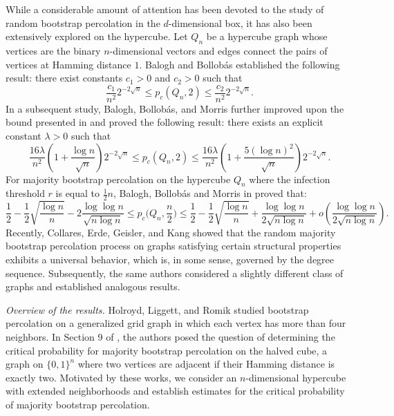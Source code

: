 \documentclass[reqno,11pt]{amsart}
\renewcommand{\leq}{\leqslant}
\begin{document}
   While a considerable amount of attention has been devoted to the study of random bootstrap percolation in the $d$-dimensional box, it has also been extensively explored on the hypercube. Let $Q_n$ be a hypercube graph whose vertices are the binary $n$-dimensional vectors and edges connect the pairs of vertices at Hamming distance $1$. Balogh and Bollob{\'a}s \cite{balogh_bollobas_2006} established the following result: there exist constants $c_1>0$ and $c_2>0$ such that
       $$ \frac{c_1}{n^2}2^{-2\sqrt{n}}\leq p_c(Q_n,2) \leq \frac{c_2}{n^2}2^{-2\sqrt{n}}.$$
    In a subsequent study, Balogh, Bollob{\'a}s, and Morris further improved upon the bound presented in \cite{balogh_bollobas_morris_2010} and proved the following result: there exists an explicit constant $\lambda > 0$ such that  
     $$ \frac{16\lambda}{n^2}\left(1+\frac{\log n }{\sqrt{n}} \right)2^{-2\sqrt{n}}\leq p_c(Q_n,2) \leq \frac{16\lambda}{n^2}\left(1+\frac{5 (\log n)^2 }{\sqrt{n}} \right)2^{-2\sqrt{n}}.$$
    For majority bootstrap percolation on the hypercube $Q_n$ where the infection threshold $r$ is equal to $\frac{1}{2}n$, Balogh, Bollob{\'a}s and Morris in \cite{balogh_bollobas_morris_2009}  proved that: 
    $$ 
    \frac{1}{2}-\frac{1}{2}\sqrt{\frac{\log n}{n}}-2\frac{\log \log n}{\sqrt{n \log n}} \leq p_c\Big(Q_n,\frac{n}{2}\Big) \leq \frac{1}{2}-\frac{1}{2}\sqrt{\frac{\log n}{n}}+\frac{\log \log n}{2\sqrt{n \log n}}+o\left(\frac{\log \log n}{2\sqrt{n \log n}} \right).
    $$   
Recently, Collares, Erde, Geisler, and Kang \cite{collares2024universalbehaviourmajoritybootstrap} showed that the random majority bootstrap percolation process on graphs satisfying certain structural properties exhibits a universal behavior, which is, in some sense, governed by the degree sequence. Subsequently, the same authors \cite{COLLARES2026104347} considered a slightly different class of graphs and established analogous results.

\emph{Overview of the results.} 
Holroyd, Liggett, and Romik \cite{holroyd} studied bootstrap percolation on a generalized grid graph in which each vertex has more than four neighbors. In Section 9 of \cite{collares2024universalbehaviourmajoritybootstrap}, the authors posed the question of determining the critical probability for majority bootstrap percolation on the halved cube, a graph on $\{0,1\}^n$ where two vertices are adjacent if their Hamming distance is exactly two. Motivated by these works, we consider an $n$-dimensional hypercube with extended neighborhoods and establish estimates for the critical probability of majority bootstrap percolation.
\end{document}
